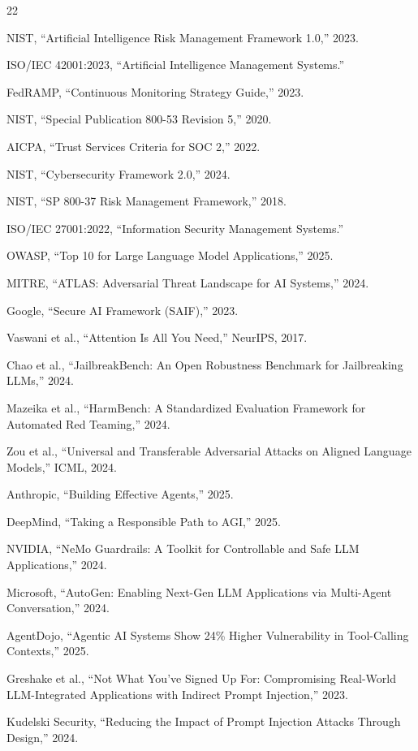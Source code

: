 \documentclass[conference]{IEEEtran}
\begin{document}
\begin{thebibliography}{22}

NIST, ``Artificial Intelligence Risk Management Framework 1.0,'' 2023.

ISO/IEC 42001:2023, ``Artificial Intelligence Management Systems.''

FedRAMP, ``Continuous Monitoring Strategy Guide,'' 2023.

NIST, ``Special Publication 800-53 Revision 5,'' 2020.

AICPA, ``Trust Services Criteria for SOC 2,'' 2022.

NIST, ``Cybersecurity Framework 2.0,'' 2024.

NIST, ``SP 800-37 Risk Management Framework,'' 2018.

ISO/IEC 27001:2022, ``Information Security Management Systems.''

OWASP, ``Top 10 for Large Language Model Applications,'' 2025.

MITRE, ``ATLAS: Adversarial Threat Landscape for AI Systems,'' 2024.

Google, ``Secure AI Framework (SAIF),'' 2023.

Vaswani et al., ``Attention Is All You Need,'' NeurIPS, 2017.

Chao et al., ``JailbreakBench: An Open Robustness Benchmark for Jailbreaking LLMs,'' 2024.

Mazeika et al., ``HarmBench: A Standardized Evaluation Framework for Automated Red Teaming,'' 2024.

Zou et al., ``Universal and Transferable Adversarial Attacks on Aligned Language Models,'' ICML, 2024.

Anthropic, ``Building Effective Agents,'' 2025.

DeepMind, ``Taking a Responsible Path to AGI,'' 2025.

NVIDIA, ``NeMo Guardrails: A Toolkit for Controllable and Safe LLM Applications,'' 2024.

Microsoft, ``AutoGen: Enabling Next-Gen LLM Applications via Multi-Agent Conversation,'' 2024.

AgentDojo, ``Agentic AI Systems Show 24\% Higher Vulnerability in Tool-Calling Contexts,'' 2025.

Greshake et al., ``Not What You've Signed Up For: Compromising Real-World LLM-Integrated Applications with Indirect Prompt Injection,'' 2023.

Kudelski Security, ``Reducing the Impact of Prompt Injection Attacks Through Design,'' 2024.

\end{thebibliography}
\end{document}
